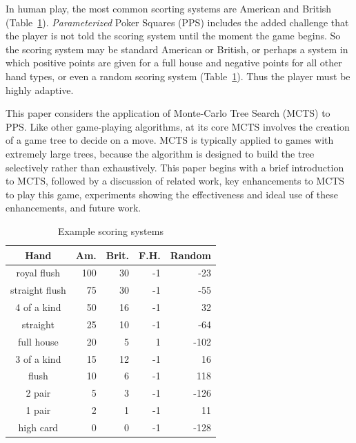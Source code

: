 \documentclass[letterpaper]{article}
\begin{document}
In human play, the most common scorting systems are American and British (Table~\ref{tbl:scoring}). {\it Parameterized} Poker Squares (PPS) includes the added challenge that the player is not told the scoring system until the moment the game begins. So the scoring system may be standard American or British, or perhaps a system in which positive points are given for a full house and negative points for all other hand types, or even a random scoring system (Table~\ref{tbl:scoring}). Thus the player must be highly adaptive.


This paper considers the application of Monte-Carlo Tree Search (MCTS) to PPS. Like other game-playing algorithms, at its core MCTS involves the creation of a game tree to decide on a move. MCTS is typically applied to games with extremely large trees, because the algorithm is designed to build the tree selectively rather than exhaustively. This paper begins with a brief introduction to MCTS, followed by a discussion of related work, key enhancements to MCTS to play this game, experiments showing the effectiveness and ideal use of these enhancements, and future work.

\begin{table}
\caption{Example scoring systems}
\label{tbl:scoring}
\centering
\begin{tabular}{c r r r r}
\hline
Hand &
{\centering Am.} &
{\centering Brit.} &
{\centering F.H.} &
{\centering Random} \\
\hline
royal flush     & 100 & 30 & -1 & -23 \\
straight flush & 75 & 30 & -1 & -55 \\
4 of a kind    & 50 & 16 & -1 & 32 \\
straight        & 25 & 10 & -1 & -64 \\
full house     & 20 & 5  & 1 & -102 \\
3 of a kind   & 15 & 12 & -1 & 16 \\
flush           & 10 & 6   & -1 & 118 \\
2 pair         & 5   & 3   & -1 & -126 \\
1 pair         & 2   & 1   & -1 & 11 \\
high card    & 0   & 0   & -1 & -128 \\
\hline
\end{tabular}
\end{table}
\end{document}
